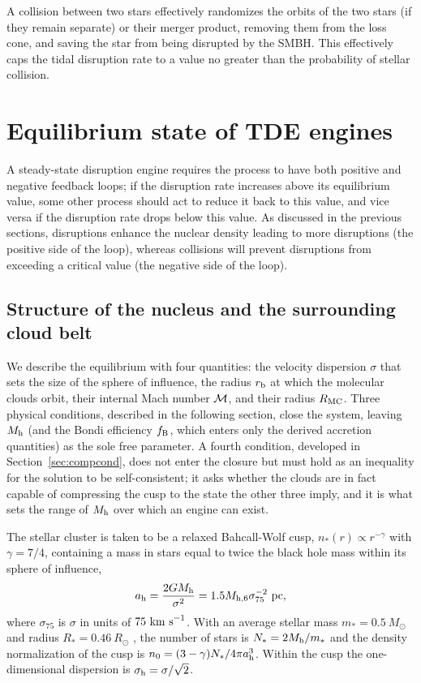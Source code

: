 \documentclass[preprint2]{aastex}
\newcommand{\msun}{M_{\odot}\xspace}
\newcommand{\mhsix}{M_{\rm h,6}\xspace}
\begin{document}
A collision between two stars effectively randomizes the orbits of the two stars (if they remain separate) or their merger product, removing them from the loss cone, and saving the star from being disrupted by the SMBH. This effectively caps the tidal disruption rate to a value no greater than the probability of stellar collision.

\section{Equilibrium state of TDE engines}\label{sec:equil}

A steady-state disruption engine requires the process to have both positive and negative feedback loops; if the disruption rate increases above its equilibrium value, some other process should act to reduce it back to this value, and vice versa if the disruption rate drops below this value. As discussed in the previous sections, disruptions enhance the nuclear density leading to more disruptions (the positive side of the loop), whereas collisions will prevent disruptions from exceeding a critical value (the negative side of the loop).

\subsection{Structure of the nucleus and the surrounding cloud belt}\label{subsec:structure}

We describe the equilibrium with four quantities: the velocity dispersion $\sigma$ that sets the size of the sphere of influence, the radius $r_{\rm b}$ at which the molecular clouds orbit, their internal Mach number ${\cal M}$, and their radius $R_{\rm MC}$. Three physical conditions, described in the following section, close the system, leaving $M_{\rm h}$ (and the Bondi efficiency $f_{\rm B}$, which enters only the derived accretion quantities) as the sole free parameter. A fourth condition, developed in Section~\ref{sec:compcond}, does not enter the closure but must hold as an inequality for the solution to be self-consistent; it asks whether the clouds are in fact capable of compressing the cusp to the state the other three imply, and it is what sets the range of $M_{\rm h}$ over which an engine can exist.

The stellar cluster is taken to be a relaxed Bahcall-Wolf cusp, $n_{\ast}(r) \propto r^{-\gamma}$ with $\gamma = 7/4$, containing a mass in stars equal to twice the black hole mass within its sphere of influence,
\begin{equation}
a_{\rm h} = \frac{2 G M_{\rm h}}{\sigma^{2}} = 1.5 \mhsix \sigma_{75}^{-2}~{\rm pc},\label{eq:ah}
\end{equation}
where $\sigma_{75}$ is $\sigma$ in units of $75~{\rm km~s}^{-1}$. With an average stellar mass $m_{\ast} = 0.5~\msun$ and radius $R_{\ast} = 0.46~R_{\odot}$ \citep{Tout:1996a}, the number of stars is $N_{\ast} = 2 M_{\rm h}/m_{\ast}$ and the density normalization of the cusp is $n_{0} = (3-\gamma)N_{\ast}/4\pi a_{\rm h}^{3}$. Within the cusp the one-dimensional dispersion is $\sigma_{\rm h} = \sigma/\sqrt{2}$.
\end{document}
